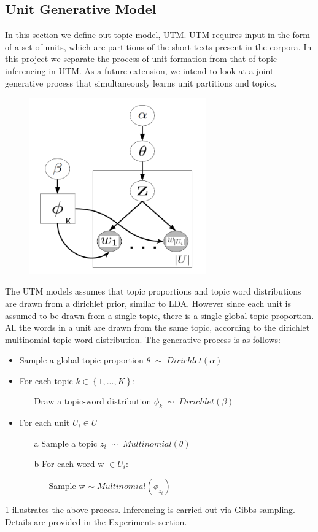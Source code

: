 \documentclass{sig-alternate-05-2015}
\begin{document}
\subsection{Unit Generative Model}
In this section we define out topic model, UTM. UTM requires input in the form of a set of units, which are partitions of the short texts present in the corpora. In this project we separate the process of unit formation from that of topic inferencing in UTM. As a future extension, we intend to look at a joint generative process that simultaneously learns unit partitions and topics.
\\
\begin{figure}
\label{UTM}
\includegraphics[width=3in]{utm}
\end{figure}
The UTM models assumes that topic proportions and topic word distributions are drawn from a dirichlet prior, similar to LDA. However since each unit is assumed to be drawn from a single topic, there is a single global topic proportion. All the words in a unit are drawn from the same topic, according to the dirichlet multinomial topic word distribution. The generative process is as follows:
\begin{itemize}
\item Sample a global topic proportion $\theta \; \sim \; Dirichlet(\alpha)$
\item For each topic $k \in \left\lbrace 1, ... ,K \right\rbrace$:  \begin{itemize} \item[] Draw a topic-word distribution $\phi_{k} \; \sim \; Dirichlet(\beta)$\end{itemize}
\item For each unit $U_{i} \in U$\begin{itemize}
\item[a] Sample a topic $z_{i} \; \sim \; Multinomial(\theta)$ 
\item[b] For each word w $\in U_{i}$: \begin{itemize} \item[] Sample w $\sim \; Multinomial(\phi_{z_{i}})$\end{itemize}
\end{itemize}
\end{itemize}
\ref{UTM} illustrates the above process. Inferencing is carried out via Gibbs sampling. Details are provided in the Experiments section.
\end{document}
